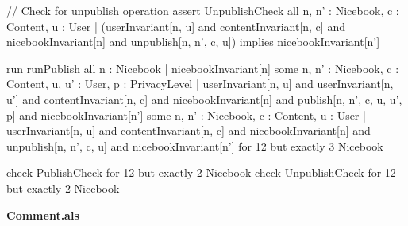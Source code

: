 \documentclass[titlepage]{article}
\begin{document}
\begin{alloy}
// Check for unpublish operation
assert UnpublishCheck {
    all n, n' : Nicebook, c : Content, u : User | 
        (userInvariant[n, u] and contentInvariant[n, c] and nicebookInvariant[n] 
            and unpublish[n, n', c, u]) implies nicebookInvariant[n']
}

run runPublish {
    all n : Nicebook | nicebookInvariant[n]
    some n, n' : Nicebook, c : Content, u, u' : User, p : PrivacyLevel | 
        userInvariant[n, u] and userInvariant[n, u'] and 
            contentInvariant[n, c] and nicebookInvariant[n] and 
            publish[n, n', c, u, u', p] and nicebookInvariant[n']
    some n, n' : Nicebook, c : Content, u : User | 
        userInvariant[n, u] and contentInvariant[n, c] and nicebookInvariant[n] 
            and unpublish[n, n', c, u] and nicebookInvariant[n']
} for 12 but exactly 3 Nicebook

check PublishCheck for 12 but exactly 2 Nicebook
check UnpublishCheck for 12 but exactly 2 Nicebook 
\end{alloy}
{\bf\large Comment.als}
\end{document}
